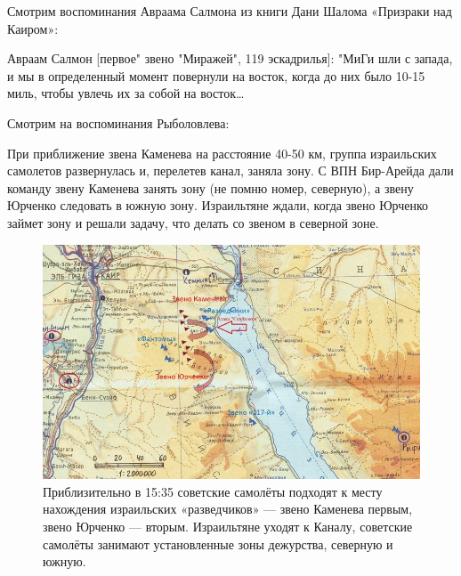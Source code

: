 Смотрим воспоминания Авраама Салмона из книги Дани Шалома «Призраки над Каиром»:

\begin{textcitation}
	Авраам Салмон [первое" звено "Миражей", 119 эскадрилья]: "МиГи шли с запада, и мы в определенный момент повернули на восток, когда до них было 10-15 миль, чтобы увлечь их за собой на восток…
\end{textcitation}

Смотрим на воспоминания Рыболовлева:

\begin{textcitation}
	При приближение звена Каменева на расстояние 40-50 км, группа израильских самолетов развернулась и, перелетев канал, заняла зону. С ВПН Бир-Арейда дали команду звену Каменева занять зону (не помню номер, северную), а звену Юрченко следовать в южную зону. Израильтяне ждали, когда звено Юрченко займет зону и решали задачу, что делать со звеном в северной зоне.
\end{textcitation}

\begin{figure}[h!tb] 
	\centering\includegraphics[scale=0.25]{Dolina_5/L5R5y0f-QOA.jpg}
	\caption{Приблизительно в 15:35 советские самолёты подходят к месту нахождения израильских «разведчиков» — звено Каменева первым, звено Юрченко — вторым. Израильтяне уходят к Каналу, советские самолёты занимают установленные зоны дежурства, северную и южную. }%
\end{figure}

